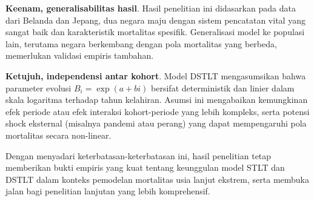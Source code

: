 \textbf{Keenam, generalisabilitas hasil}. Hasil penelitian ini didasarkan pada data dari Belanda dan Jepang, dua negara maju dengan sistem pencatatan vital yang sangat baik dan karakteristik mortalitas spesifik. Generalisasi model ke populasi lain, terutama negara berkembang dengan pola mortalitas yang berbeda, memerlukan validasi empiris tambahan.

\textbf{Ketujuh, independensi antar kohort}. Model DSTLT mengasumsikan bahwa parameter evolusi $B_i = \exp(a + bi)$ bersifat deterministik dan linier dalam skala logaritma terhadap tahun kelahiran. Asumsi ini mengabaikan kemungkinan efek periode atau efek interaksi kohort-periode yang lebih kompleks, serta potensi shock eksternal (misalnya pandemi atau perang) yang dapat mempengaruhi pola mortalitas secara non-linear.

Dengan menyadari keterbatasan-keterbatasan ini, hasil penelitian tetap memberikan bukti empiris yang kuat tentang keunggulan model STLT dan DSTLT dalam konteks pemodelan mortalitas usia lanjut ekstrem, serta membuka jalan bagi penelitian lanjutan yang lebih komprehensif.